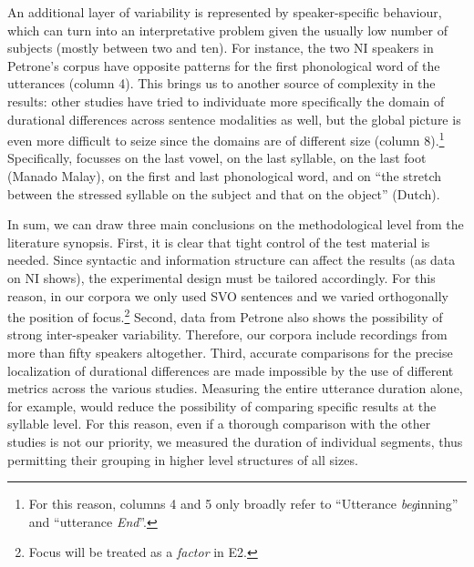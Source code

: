 An additional layer of variability is represented by speaker-specific behaviour, which can turn into an interpretative problem given the usually low number of subjects (mostly between two and ten). For instance, the two NI speakers in Petrone's corpus have opposite patterns for the first phonological word of the utterances (column 4). This brings us to another source of complexity in the results: other studies have tried to individuate more specifically the domain of durational differences across sentence modalities as well, but the global picture is even more difficult to seize since the domains are of different size (column 8).\footnote{For this reason, columns 4 and 5 only broadly refer to ``Utterance \textit{beg}inning'' and ``utterance \textit{End}''.} Specifically, \citet{smith2002prosodic} focusses on the last vowel, \citet{ryalls1994effects} on the last syllable, \citet{vanheuven2005speech} on the last foot (Manado Malay), \citet{petrone2008role} on the first and last phonological word, and \citet{vanheuven2005speech} on 
\enlargethispage{2em}
``the stretch between the stressed syllable on the subject and that on the object'' (Dutch). 

In sum, we can draw three main conclusions on the methodological level from the literature synopsis. First, it is clear that tight control of the test material is needed. Since syntactic and information structure can affect the results (as data on NI shows), the experimental design must be tailored accordingly. For this reason, in our corpora we only used SVO sentences and we varied orthogonally the position of focus.\footnote{Focus will be treated as a \textit{factor} in E2.} Second, data from Petrone also shows the possibility of strong inter-speaker variability. Therefore, our corpora include recordings from more than fifty speakers altogether. Third, accurate comparisons for the precise localization of durational differences are made impossible by the use of different metrics across the various studies. Measuring the entire utterance duration alone, for example, would reduce the possibility of comparing specific results at the syllable level. For this reason, even if a thorough comparison with the other studies is not our priority, we measured the duration of individual segments, thus permitting their grouping in higher level structures of all sizes.

